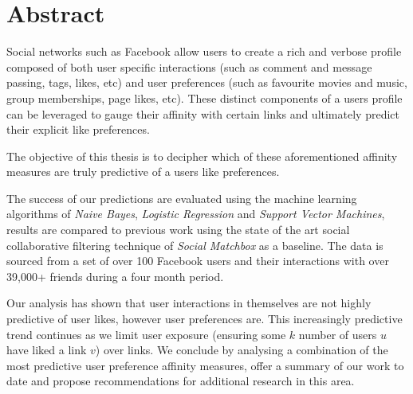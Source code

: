 
\chapter*{Abstract}
\label{cha:abstract}

Social networks such as Facebook allow users to create a rich and verbose profile composed of both user specific interactions (such as 
comment and message passing, tags, likes, etc) and user preferences (such as favourite movies and music, group memberships, page likes, etc). 
These distinct components of a users profile can be leveraged to gauge their affinity with certain links and ultimately predict their
explicit like preferences.

The objective of this thesis is to decipher which of these aforementioned affinity measures are truly predictive of a users like preferences.

The success of our predictions are evaluated using the machine learning algorithms of  
\emph{Naive Bayes}, \emph{Logistic Regression} and \emph{Support Vector Machines}, results are compared to previous 
work using the state of the art social collaborative filtering technique of \emph{Social Matchbox} as a baseline. 
The data is sourced from a set of over 100 Facebook users and their interactions with over 39,000+ friends during a four month period.

Our analysis has shown that user interactions in themselves are not highly predictive of user likes, however user preferences are. 
This increasingly predictive trend continues as we limit user exposure (ensuring some $k$ number of users $u$ have liked a link $v$) over links. 
We conclude by analysing a combination of the most predictive user preference affinity measures, offer a summary of our work to date and propose 
recommendations for additional research in this area.

